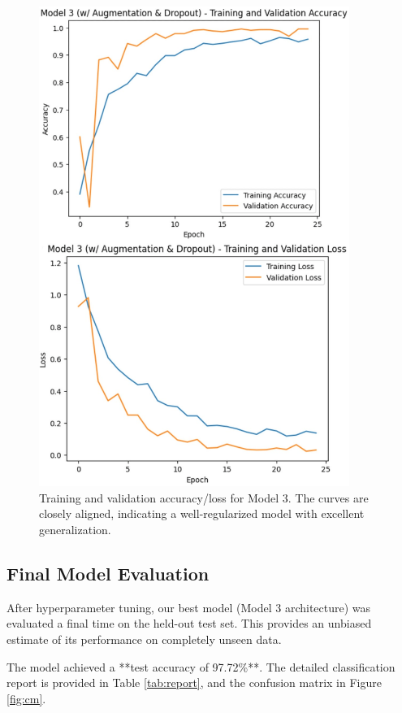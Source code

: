 \documentclass[pdflatex,sn-mathphys-num]{sn-jnl}%
\theoremstyle{thmstyleone}%
\theoremstyle{thmstyletwo}%
\theoremstyle{thmstylethree}%
\begin{document}
\begin{figure}[h]
\centering
\includegraphics[width=0.9\textwidth]{model3_curves.png}
\caption{Training and validation accuracy/loss for Model 3. The curves are closely aligned, indicating a well-regularized model with excellent generalization.}\label{fig:model3}
\end{figure}

\subsection{Final Model Evaluation}
After hyperparameter tuning, our best model (Model 3 architecture) was evaluated a final time on the held-out test set. This provides an unbiased estimate of its performance on completely unseen data.

The model achieved a **test accuracy of 97.72\%**. The detailed classification report is provided in Table \ref{tab:report}, and the confusion matrix in Figure \ref{fig:cm}.
\end{document}
